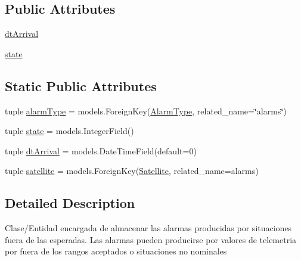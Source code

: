 \subsection*{Public Attributes}
\begin{DoxyCompactItemize}
\item 
\hyperlink{class_ground_segment_1_1models_1_1_alarm_1_1_alarm_1_1_alarm_aa22cb77ce71da33580d369eed7306091}{dt\+Arrival}
\item 
\hyperlink{class_ground_segment_1_1models_1_1_alarm_1_1_alarm_1_1_alarm_a485c4c559bb998a413e46817a9930b40}{state}
\end{DoxyCompactItemize}
\subsection*{Static Public Attributes}
\begin{DoxyCompactItemize}
\item 
tuple \hyperlink{class_ground_segment_1_1models_1_1_alarm_1_1_alarm_1_1_alarm_af5f6eb07782af5a907880d9120c1bca4}{alarm\+Type} = models.\+Foreign\+Key(\hyperlink{class_ground_segment_1_1models_1_1_alarm_1_1_alarm_type_1_1_alarm_type}{Alarm\+Type}, related\+\_\+name=\char`\"{}alarms\char`\"{})
\item 
tuple \hyperlink{class_ground_segment_1_1models_1_1_alarm_1_1_alarm_1_1_alarm_a567e2e2aa9906455d4678df229dac10c}{state} = models.\+Integer\+Field()
\item 
tuple \hyperlink{class_ground_segment_1_1models_1_1_alarm_1_1_alarm_1_1_alarm_a020cb3f0f8923b094ba710029d0dd433}{dt\+Arrival} = models.\+Date\+Time\+Field(default=0)
\item 
tuple \hyperlink{class_ground_segment_1_1models_1_1_alarm_1_1_alarm_1_1_alarm_a605cb206ae2e10d3a552d9dd47f5ba58}{satellite} = models.\+Foreign\+Key(\hyperlink{class_ground_segment_1_1models_1_1_satellite_1_1_satellite}{Satellite}, related\+\_\+name=\textquotesingle{}alarms\textquotesingle{})
\end{DoxyCompactItemize}


\subsection{Detailed Description}
\begin{DoxyVerb}Clase/Entidad encargada de almacenar las alarmas producidas por situaciones fuera de las esperadas.
Las alarmas pueden producirse por valores de telemetria por fuera de los rangos aceptados o situaciones no nominales    
\end{DoxyVerb}
 

